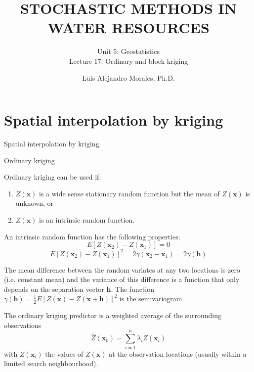 \documentclass[8pt]{beamer}
\title{STOCHASTIC METHODS IN WATER RESOURCES}
\subtitle{Unit 5: Geostatistics \\ Lecture 17: Ordinary and block kriging}
\author{Luis Alejandro Morales, Ph.D.}
\institute{Universidad Nacional de Colombia \\ Department of Civil and Agriculture Engineering} %
\renewcommand{\emph}[1]{\textcolor{myorange}{#1}}
\begin{document}
\begin{frame}
    \titlepage
\end{frame}

\section{Spatial interpolation by kriging}
 \begin{frame}{Spatial interpolation by kriging}
     \begin{block}{Ordinary kriging}
    \end{block}
    \alert{Ordinary kriging} can be used if:
    \begin{enumerate}
        \item $Z(\mathbf{x})$ is a \emph{wide sense stationary random function} but the mean of $Z(\mathbf{x})$ is unknown, or
        \item $Z(\mathbf{x})$ is an intrinsic \emph{random function}.
    \end{enumerate}
    An intrinsic \emph{random function} has the following properties:
    \[
        E[Z(\mathbf{x}_2) - Z(\mathbf{x}_1)] = 0
    \]
    \[
        E[Z(\mathbf{x}_2) - Z(\mathbf{x}_1)]^2 = 2\gamma(\mathbf{x}_2 - \mathbf{x}_1) = 2 \gamma(\mathbf{h})
    \]

    The mean difference between the \emph{random variates} at any two locations is zero (i.e. \emph{constant mean}) and the  \emph{variance} of this difference is a function that only depends on the separation vector $\mathbf{h}$. The function $\gamma(\mathbf{h}) = \frac{1}{2} E[Z(\mathbf{x})-Z(\mathbf{x}+\mathbf{h})]^2 $ is the \emph{semivariogram}.

    The \emph{ordinary kriging predictor} is a weighted average of the surrounding observations
    \begin{equation}
        \hat{Z}(\mathbf{x}_0) = \sum_{i=1}^n \lambda_i Z(\mathbf{x}_i)
        \label{e714}
    \end{equation}
with $Z(\mathbf{x}_i)$ the values of $Z(\mathbf{x})$ at the observation locations (usually within a limited search neighbourhood). 
   \end{frame}
\end{document}
